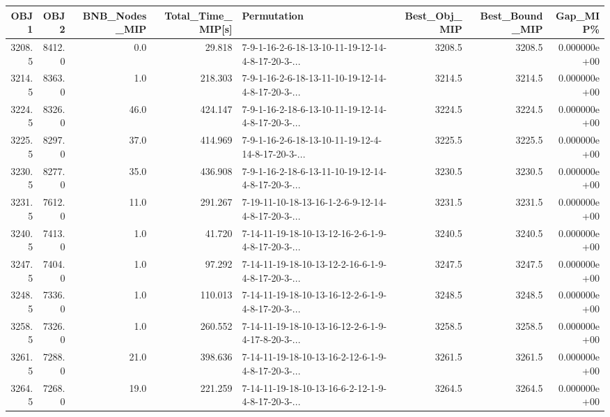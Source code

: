 \begin{tabular}{rrrrlrrr}
\toprule
   OBJ1 &    OBJ2 &  BNB\_Nodes\_MIP &  Total\_Time\_MIP[s] &                                        Permutation &  Best\_Obj\_MIP &  Best\_Bound\_MIP &      Gap\_MIP\% \\
\midrule
 3208.5 &  8412.0 &            0.0 &             29.818 &  7-9-1-16-2-6-18-13-10-11-19-12-14-4-8-17-20-3-... &        3208.5 &          3208.5 &  0.000000e+00 \\
 3214.5 &  8363.0 &            1.0 &            218.303 &  7-9-1-16-2-6-18-13-11-10-19-12-14-4-8-17-20-3-... &        3214.5 &          3214.5 &  0.000000e+00 \\
 3224.5 &  8326.0 &           46.0 &            424.147 &  7-9-1-16-2-18-6-13-10-11-19-12-14-4-8-17-20-3-... &        3224.5 &          3224.5 &  0.000000e+00 \\
 3225.5 &  8297.0 &           37.0 &            414.969 &  7-9-1-16-2-6-18-13-10-11-19-12-4-14-8-17-20-3-... &        3225.5 &          3225.5 &  0.000000e+00 \\
 3230.5 &  8277.0 &           35.0 &            436.908 &  7-9-1-16-2-18-6-13-11-10-19-12-14-4-8-17-20-3-... &        3230.5 &          3230.5 &  0.000000e+00 \\
 3231.5 &  7612.0 &           11.0 &            291.267 &  7-19-11-10-18-13-16-1-2-6-9-12-14-4-8-17-20-3-... &        3231.5 &          3231.5 &  0.000000e+00 \\
 3240.5 &  7413.0 &            1.0 &             41.720 &  7-14-11-19-18-10-13-12-16-2-6-1-9-4-8-17-20-3-... &        3240.5 &          3240.5 &  0.000000e+00 \\
 3247.5 &  7404.0 &            1.0 &             97.292 &  7-14-11-19-18-10-13-12-2-16-6-1-9-4-8-17-20-3-... &        3247.5 &          3247.5 &  0.000000e+00 \\
 3248.5 &  7336.0 &            1.0 &            110.013 &  7-14-11-19-18-10-13-16-12-2-6-1-9-4-8-17-20-3-... &        3248.5 &          3248.5 &  0.000000e+00 \\
 3258.5 &  7326.0 &            1.0 &            260.552 &  7-14-11-19-18-10-13-16-12-2-6-1-9-4-17-8-20-3-... &        3258.5 &          3258.5 &  0.000000e+00 \\
 3261.5 &  7288.0 &           21.0 &            398.636 &  7-14-11-19-18-10-13-16-2-12-6-1-9-4-8-17-20-3-... &        3261.5 &          3261.5 &  0.000000e+00 \\
 3264.5 &  7268.0 &           19.0 &            221.259 &  7-14-11-19-18-10-13-16-6-2-12-1-9-4-8-17-20-3-... &        3264.5 &          3264.5 &  0.000000e+00 \\

\end{tabular}
